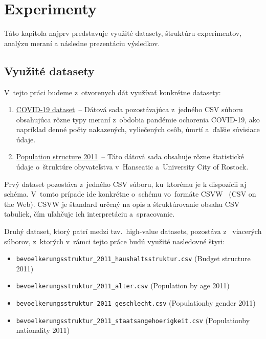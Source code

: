 \chapter{Experimenty}

Táto kapitola najprv predstavuje využité datasety, štruktúru experimentov, analýzu meraní a následne prezentáciu výsledkov.

\section{Využité datasety}

V~tejto práci budeme z~otvorenych dát využívať konkrétne datasety:
\begin{enumerate}
\item \href{https://data.gov.cz/datov\%C3\%A1-sada?iri=https\%3A\%2F\%2Fdata.gov.cz\%2Fzdroj\%2Fdatov\%C3\%A9-sady\%2F00024341\%2Fc5b85b8c662a72b9c0c13bea4a098448}{COVID-19 dataset}~-- Dátová sada pozostávajúca z~jedného CSV súboru obsahujúca rôzne typy meraní z~obdobia pandémie ochorenia COVID-19, ako napríklad denné počty nakazených, vyliečených osôb, úmrtí a~ďalšie súvisiace údaje.
\item \href{https://data.europa.eu/data/datasets/92437de0-a730-428a-921d-1d9c418072d6?locale=en}{Population structure 2011}~-- Táto dátová sada obsahuje rôzne štatistické údaje o~štruktúre obyvateľstva v~Hanseatic a~University City of Rostock.
\end{enumerate}

Prvý dataset pozostáva z~jedného CSV súboru, ku~ktorému je k dispozícii aj schéma. V~tomto prípade ide konkrétne o~schému vo~formáte CSVW~\cite{csvw} (CSV on the Web). CSVW je štandard určený na opis a štruktúrovanie obsahu CSV tabuliek, čím uľahčuje ich interpretáciu a~spracovanie.

Druhý dataset, ktorý patrí medzi tzv.~high-value datasets, pozostáva z~ viacerých súborov, z~ktorých v~rámci tejto práce budú využité nasledovné štyri:
\begin{itemize}
\item \texttt{bevoelkerungsstruktur\_2011\_haushaltsstruktur.csv} (Budget struc\-tu\-re 2011)
\item \texttt{bevoelkerungsstruktur\_2011\_alter.csv} (Population by age 2011)
\item \texttt{bevoelkerungsstruktur\_2011\_geschlecht.csv} (Po\-pu\-la\-ti\-on\newline by gen\-der 2011)
\item \texttt{bevoelkerungsstruktur\_2011\_staatsangehoerigkeit.csv} (Po\-pu\-la\-ti\-on\newline by na\-ti\-o\-na\-li\-ty 2011)
\end{itemize}

